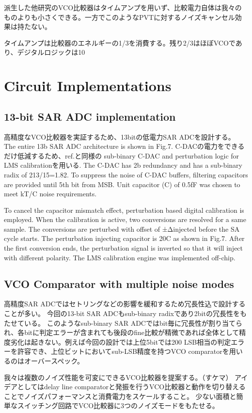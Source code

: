 \documentclass[letterpaper, 10 pt, conference]{ieeeconf}  %
\begin{document}
派生した他研究のVCO比較器はタイムアンプを用いず、比較電力自体は我々のものよりも小さくできる。一方でこのようなPVTに対するノイズキャンセル効果は持たない。

タイムアンプは比較器のエネルギーの1/3を消費する。残り2/3はほぼVCOであり、デジタルロジックは10%

\section{Circuit Implementations}
\subsection{13-bit SAR ADC implementation}

高精度なVCO比較器を実証するため、13bitの低電力SAR ADCを設計する。
The entire 13b SAR ADC architecture is shown in Fig.7. C-DACの電力をできるだけ低減するため、ref.\cite{liu201012b}と同様の sub-binary C-DAC and perturbation logic for LMS calibrationを用いる. The C-DAC has 2b redundancy and has a sub-binary radix of 213/15=1.82. To suppress the noise of C-DAC buffers, filtering capacitors \cite{miki20154} are provided until 5th bit from MSB. Unit capacitor (C) of 0.5fF was chosen  to meet kT/C noise requirements.

To cancel the capacitor mismatch effect, perturbation based digital calibration \cite{liu201012b} is employed. When the calibration is active, two conversions are resolved for a same sample. The conversions are perturbed with offset of ±Δinjected before the SA cycle starts. The perturbation injecting capacitor is 20C as shown in Fig.7. After the first conversion ends, the perturbation signal is inverted so that it will inject with different polarity. The LMS calibration engine was implemented off-chip.

\subsection{VCO Comparator with multiple noise modes}
高精度SAR ADCではセトリングなどの影響を緩和するため冗長性込で設計することが多い。
今回の13-bit SAR ADCもsub-binary radixであり2bitの冗長性をもたせている。
このようなsub-binary SAR ADCではbit毎に冗長性が割り当てられ、各bitに判定エラーが含まれても後段のfine比較が精微であれば全体として精度劣化は起きない。例えば今回の設計では上位5bitでは200 LSB相当の判定エラーを許容でき、上位ビットにおいてsub-LSB精度を持つVCO comparatorを用いるのはオーバースペック。

我々は複数のノイズ性能を可変にできるVCO比較器を提案する。（すケマ）
アイデアとしてはdelay line comparatorと発振を行うVCO比較器と動作を切り替えることでノイズパフォーマンスと消費電力をスケールすること。
少ない面積と簡単なスイッチング回路でVCO比較器に3つのノイズモードをもたせる。
\end{document}
